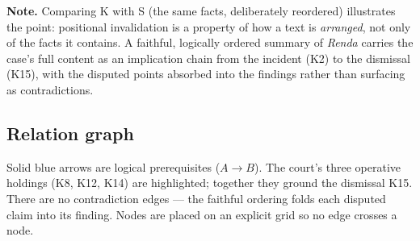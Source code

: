 \documentclass[11pt]{article}
\begin{document}
\noindent
\textbf{Note.} Comparing K with S (the same facts, deliberately reordered)
illustrates the point: positional invalidation is a property of how a text is
\emph{arranged}, not only of the facts it contains. A faithful, logically ordered
summary of \emph{Renda} carries the case's full content as an implication chain
from the incident (K2) to the dismissal (K15), with the disputed points absorbed
into the findings rather than surfacing as contradictions.

\subsection*{Relation graph}

Solid blue arrows are logical prerequisites ($A \rightarrow B$). The court's three
operative holdings (K8, K12, K14) are highlighted; together they ground the
dismissal K15. There are no contradiction edges --- the faithful ordering folds
each disputed claim into its finding. Nodes are placed on an explicit grid so no
edge crosses a node.
\end{document}
